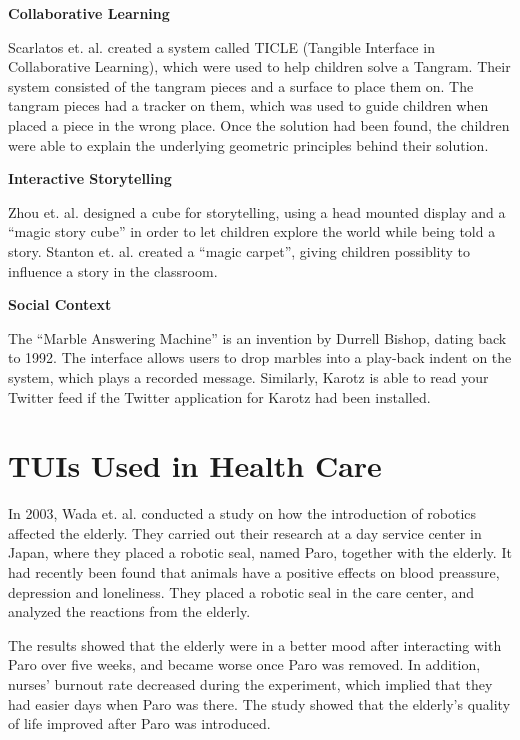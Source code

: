 \textbf{Collaborative Learning} 

Scarlatos et. al. created a system called TICLE (Tangible Interface in Collaborative Learning), which were used to help children solve a Tangram\cite{scarlatos1999ticle}. Their system consisted of the tangram pieces and a surface to place them on. The tangram pieces had a tracker on them, which was used to guide children when placed a piece in the wrong place. Once the solution had been found, the children were able to explain the underlying geometric principles behind their solution.   

\textbf{Interactive Storytelling} 

Zhou et. al. designed a cube for storytelling, using a head mounted display and a ``magic story cube'' in order to let children explore the world while being told a story\cite{zhou2004magic}. Stanton et. al. created a ``magic carpet'', giving children possiblity to influence a story in the classroom\cite{stanton2001classroom}. 

\textbf{Social Context} 

The ``Marble Answering Machine'' is an invention by Durrell Bishop, dating back to 1992\cite{crampton1995hand}. The interface allows users to drop marbles into a play-back indent on the system, which plays a recorded message. Similarly, Karotz is able to read your Twitter feed if the Twitter application for Karotz had been installed.   


\section{TUIs Used in Health Care}
\label{sec:effectofrobots}
In 2003, Wada et. al. conducted a study on how the introduction of robotics affected the elderly\cite{wada2004effects}. They carried out their research at a day service center in Japan, where they placed a robotic seal, named Paro, together with the elderly. It had recently been found that animals have a positive effects on blood preassure, depression and loneliness. They placed a robotic seal in the care center, and analyzed the reactions from the elderly. 

The results showed that the elderly were in a better mood after interacting with Paro over five weeks, and became worse once Paro was removed. In addition, nurses' burnout rate decreased during the experiment, which implied that they had easier days when Paro was there. The study showed that the elderly's quality of life improved after Paro was introduced.           

